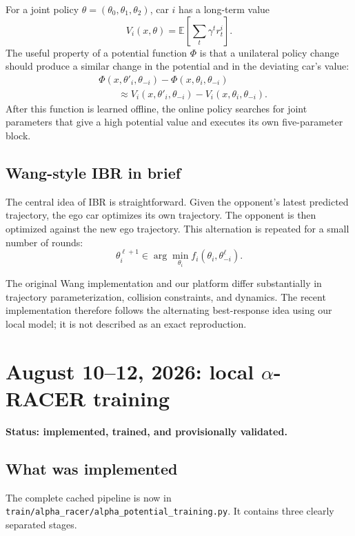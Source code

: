 \documentclass[11pt]{article}
\newcommand{\code}[1]{\texttt{#1}}
\newcommand{\status}[1]{\textcolor{blue!65!black}{\textbf{#1}}}
\begin{document}
For a joint policy $\theta=(\theta_0,\theta_1,\theta_2)$, car $i$ has a
long-term value
\[
  V_i(x,\theta)=\mathbb{E}\left[\sum_t\gamma^t r^i_t\right].
\]
The useful property of a potential function $\Phi$ is that a unilateral policy
change should produce a similar change in the potential and in the deviating
car's value:
\[
\begin{split}
  &\Phi(x,\theta'_i,\theta_{-i})-\Phi(x,\theta_i,\theta_{-i})\\
  &\qquad\approx
  V_i(x,\theta'_i,\theta_{-i})-V_i(x,\theta_i,\theta_{-i}).
\end{split}
\]
After this function is learned offline, the online policy searches for joint
parameters that give a high potential value and executes its own five-parameter
block.

\subsection{Wang-style IBR in brief}

The central idea of IBR is straightforward. Given the opponent's latest
predicted trajectory, the ego car optimizes its own trajectory. The opponent is
then optimized against the new ego trajectory. This alternation is repeated for
a small number of rounds:
\[
  \theta_i^{\ell+1}
  \in\arg\min_{\theta_i} f_i(\theta_i,\theta_{-i}^{\ell}).
\]

The original Wang implementation and our platform differ substantially in
trajectory parameterization, collision constraints, and dynamics. The recent
implementation therefore follows the alternating best-response idea using our
local model; it is not described as an exact reproduction.

\section{August 10--12, 2026: local $\alpha$-RACER training}

\status{Status: implemented, trained, and provisionally validated.}

\subsection{What was implemented}

The complete cached pipeline is now in
\code{train/alpha\_racer/alpha\_potential\_training.py}. It contains three
clearly separated stages.
\end{document}
